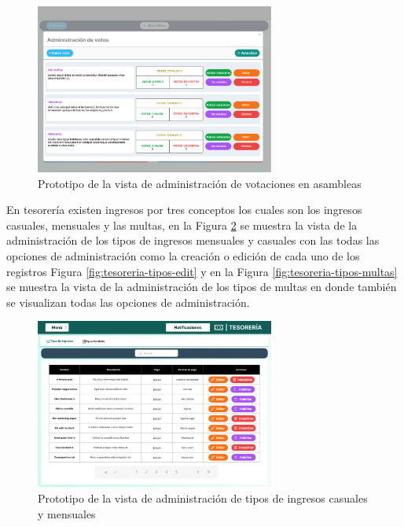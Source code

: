 \begin{figure}[H]
    \centering
    \includegraphics[width=0.7\textwidth]{resources/images/convocatorias_votaciones}
    \caption{Prototipo de la vista de administración de votaciones en asambleas}
    \label{fig:convocatorias-votaciones}
\end{figure}

En tesorería existen ingresos por tres conceptos los cuales son los ingresos casuales, mensuales y las multas, en la Figura \ref{fig:tesoreria-tipos} se muestra la vista de la administración de los tipos de ingresos mensuales y casuales con las todas las opciones de administración como la creación o edición de cada uno de los registros Figura \ref{fig:tesoreria-tipos-edit} y en la Figura \ref{fig:tesoreria-tipos-multas} se muestra la vista de la administración de los tipos de multas en donde también se visualizan todas las opciones de administración.


\begin{figure}[H]
    \centering
    \includegraphics[width=0.7\textwidth]{resources/images/tesoreia - tipos}
    \caption{Prototipo de la vista de administración de tipos de ingresos casuales y mensuales}
    \label{fig:tesoreria-tipos}
\end{figure}

